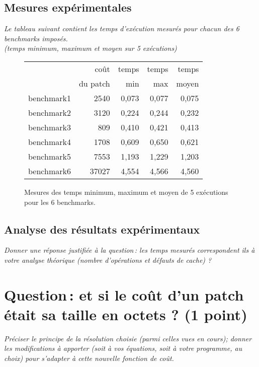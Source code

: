 \documentclass[a4paper, 10pt, french]{article}
\begin{document}
  \subsection{Mesures expérimentales}
    {\em Le tableau suivant contient les temps d'exécution mesurés pour chacun des 6 benchmarks imposés.\\
              (temps minimum, maximum et moyen sur 5 exécutions)
    }

    \begin{figure}[h]
      \begin{center}
        \begin{tabular}{|l||r||r|r|r||}
          \hline
          \hline
            & coût         & temps     & temps   & temps \\
            & du patch     & min       & max     & moyen \\
          \hline
          \hline
            benchmark1 &2540&   0,073   &0,077     &0,075     \\
          \hline
            benchmark2 &3120&0,224      &0,244     &0,232     \\
          \hline
            benchmark3 &809&0,410    &0,421     &0,413     \\
          \hline
            benchmark4 &1708&0,609     &0,650     &0,621     \\
          \hline
            benchmark5 &7553&1,193     &1,229     &1,203     \\
          \hline
            benchmark6 &37027&4,554     &4,566     &4,560     \\
          \hline
          \hline
        \end{tabular}
        \caption{Mesures des temps minimum, maximum et moyen de 5 exécutions pour les 6 benchmarks.}
        \label{table-temps}
      \end{center}
    \end{figure}

\subsection{Analyse des résultats expérimentaux}
{\em Donner  une réponse justifiée  à la question\,: 
              les  temps mesurés correspondent ils  à votre analyse théorique (nombre d’opérations et défauts de cache) ?
}

\section{Question\,: et  si le coût d'un patch était sa taille en octets ? (1 point)}
{\em Préciser le principe de la résolution choisie (parmi celles vues en cours); donner  les modifications à apporter (soit à vos  équations, soit à votre programme, au choix) 
pour s'adapter à cette nouvelle fonction de coût. 
}
\end{document}
